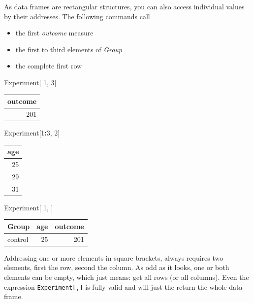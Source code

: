 \documentclass[]{svmono}
\newenvironment{Shaded}{\begin{snugshade}}{\end{snugshade}}
\newcommand{\DecValTok}[1]{\textcolor[rgb]{0.00,0.00,0.81}{#1}}
\newcommand{\OperatorTok}[1]{\textcolor[rgb]{0.81,0.36,0.00}{\textbf{#1}}}
\newcommand{\NormalTok}[1]{#1}
\providecommand{\tightlist}{%
  \setlength{\itemsep}{0pt}\setlength{\parskip}{0pt}}
\theoremstyle{definition}
\theoremstyle{definition}
\theoremstyle{definition}
\theoremstyle{remark}
\begin{document}
As data frames are rectangular structures, you can also access
individual values by their addresses. The following commands call

\begin{itemize}
\tightlist
\item
  the first \emph{outcome} measure
\item
  the first to third elements of \emph{Group}
\item
  the complete first row
\end{itemize}

\begin{Shaded}
\begin{Highlighting}[]
\NormalTok{Experiment[  }\DecValTok{1}\NormalTok{, }\DecValTok{3}\NormalTok{]}
\end{Highlighting}
\end{Shaded}

\begin{tabular}{r}
\hline
outcome\\
\hline
201\\
\hline
\end{tabular}

\begin{Shaded}
\begin{Highlighting}[]
\NormalTok{Experiment[}\DecValTok{1}\OperatorTok{:}\DecValTok{3}\NormalTok{, }\DecValTok{2}\NormalTok{]}
\end{Highlighting}
\end{Shaded}

\begin{tabular}{r}
\hline
age\\
\hline
25\\
\hline
29\\
\hline
31\\
\hline
\end{tabular}

\begin{Shaded}
\begin{Highlighting}[]
\NormalTok{Experiment[  }\DecValTok{1}\NormalTok{,  ]}
\end{Highlighting}
\end{Shaded}

\begin{tabular}{l|r|r}
\hline
Group & age & outcome\\
\hline
control & 25 & 201\\
\hline
\end{tabular}

Addressing one or more elements in square brackets, always requires two
elements, first the row, second the column. As odd as it looks, one or
both elements can be empty, which just means: get all rows (or all
columns). Even the expression \texttt{Experiment{[},{]}} is fully valid
and will just the return the whole data frame.
\end{document}
